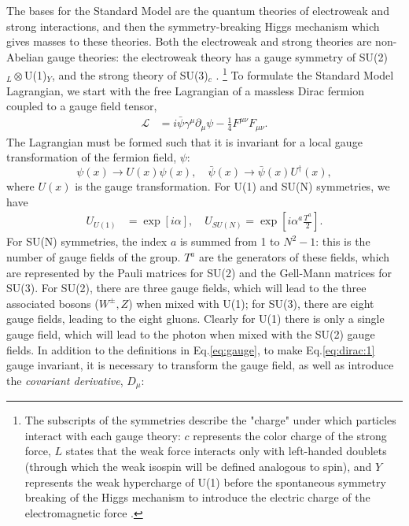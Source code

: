 \documentclass[a4paper,12pt]{article}
\begin{document}
The bases for the Standard Model are the quantum theories of electroweak and strong interactions, and then the symmetry-breaking Higgs mechanism which gives masses to these theories.
Both the electroweak and strong theories are non-Abelian gauge theories: the electroweak theory has a gauge symmetry of SU(2)$_{L}\otimes$U(1)$_Y$, and the strong theory of SU(3)$_{c}$ \cite{bail}.
\hspace{-9pt}\footnote{The subscripts of the symmetries describe the "charge" under which particles interact with each gauge theory: $c$ represents the color charge of the strong force, $L$ states that the weak force interacts only with left-handed doublets (through which the weak isospin will be defined analogous to spin), and $Y$ represents the weak hypercharge of U(1) before the spontaneous symmetry breaking of the Higgs mechanism to introduce the electric charge of the electromagnetic force \cite{schwartz}.}
\hspace{-5pt}To formulate the Standard Model Lagrangian, we start with the free Lagrangian of a massless Dirac fermion coupled to a gauge field tensor,
\begin{align}
    \label{eq:dirac:1}
    \mathcal{L} &= i\bar{\psi}\gamma^\mu\partial_\mu\psi - \frac14F^{\mu\nu}F_{\mu\nu}.
\end{align}
The Lagrangian must be formed such that it is invariant for a local gauge transformation of the fermion field, $\psi$:
\begin{equation}
    \label{eq:local}
    \psi(x)\to U(x)\psi(x),\quad \bar{\psi}(x)\to\bar{\psi}(x)U^\dagger(x),
\end{equation}
where $U(x)$ is the gauge transformation.
For U(1) and SU(N) symmetries, we have
\begin{align}
    \label{eq:gauge} 
    U_{U(1)} &= \exp\left[i\alpha\right],\quad U_{SU(N)} = \exp\left[i\alpha^a\frac{T^a}{2}\right].
\end{align}
For SU(N) symmetries, the index $a$ is summed from 1 to $N^2-1$: this is the number of gauge fields of the group.
$T^a$ are the generators of these fields, which are represented by the Pauli matrices for SU(2) and the Gell-Mann matrices for SU(3).
For SU(2), there are three gauge fields, which will lead to the three associated bosons ($W^{\pm},Z$) when mixed with U(1); for SU(3), there are eight gauge fields, leading to the eight gluons.
Clearly for U(1) there is only a single gauge field, which will lead to the photon when mixed with the SU(2) gauge fields.
In addition to the definitions in Eq.\eqref{eq:gauge}, to make Eq.\eqref{eq:dirac:1} gauge invariant, it is necessary to transform the gauge field, as well as introduce the \textit{covariant derivative}, $D_\mu$:
\end{document}

